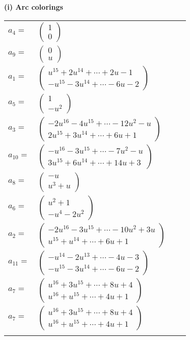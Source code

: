 \documentclass[1p]{elsarticle_modified}
\theoremstyle{definition}
\begin{document}
\flushleft \textbf{(i) Arc colorings}\\
\begin{tabular}{m{7pt} m{180pt} m{7pt} m{180pt} }
\flushright $a_{4}=$&$\begin{pmatrix}1\\0\end{pmatrix}$ \\
\flushright $a_{9}=$&$\begin{pmatrix}0\\u\end{pmatrix}$ \\
\flushright $a_{1}=$&$\begin{pmatrix}u^{15}+2 u^{14}+\cdots+2 u-1\\- u^{15}-3 u^{14}+\cdots-6 u-2\end{pmatrix}$ \\
\flushright $a_{5}=$&$\begin{pmatrix}1\\- u^2\end{pmatrix}$ \\
\flushright $a_{3}=$&$\begin{pmatrix}-2 u^{16}-4 u^{15}+\cdots-12 u^2- u\\2 u^{15}+3 u^{14}+\cdots+6 u+1\end{pmatrix}$ \\
\flushright $a_{10}=$&$\begin{pmatrix}- u^{16}-3 u^{15}+\cdots-7 u^2- u\\3 u^{15}+6 u^{14}+\cdots+14 u+3\end{pmatrix}$ \\
\flushright $a_{8}=$&$\begin{pmatrix}- u\\u^3+u\end{pmatrix}$ \\
\flushright $a_{6}=$&$\begin{pmatrix}u^2+1\\- u^4-2 u^2\end{pmatrix}$ \\
\flushright $a_{2}=$&$\begin{pmatrix}-2 u^{16}-3 u^{15}+\cdots-10 u^2+3 u\\u^{15}+u^{14}+\cdots+6 u+1\end{pmatrix}$ \\
\flushright $a_{11}=$&$\begin{pmatrix}- u^{14}-2 u^{13}+\cdots-4 u-3\\- u^{15}-3 u^{14}+\cdots-6 u-2\end{pmatrix}$ \\
\flushright $a_{7}=$&$\begin{pmatrix}u^{16}+3 u^{15}+\cdots+8 u+4\\u^{16}+u^{15}+\cdots+4 u+1\end{pmatrix}$\\ \flushright $a_{7}=$&$\begin{pmatrix}u^{16}+3 u^{15}+\cdots+8 u+4\\u^{16}+u^{15}+\cdots+4 u+1\end{pmatrix}$\\&\end{tabular}
\end{document}
